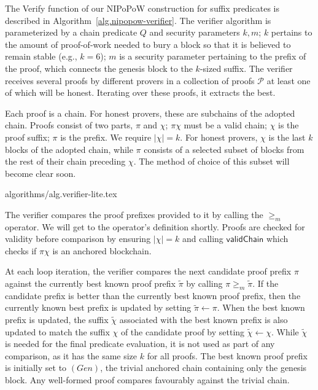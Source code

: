 The \textsf{Verify} function of our NIPoPoW construction  for suffix predicates
is described in Algorithm~\ref{alg.nipopow-verifier}. The verifier algorithm is
parameterized by a chain predicate $Q$ and security parameters $k, m$; $k$
pertains to the amount of proof-of-work needed to bury a block so that it is
believed to remain stable (e.g., $k = 6$); $m$ is a security parameter
pertaining to the prefix of the proof, which connects the genesis block to the
$k$-sized suffix. The verifier receives several proofs by different provers in a
collection of proofs $\mathcal{P}$ at least one of which will be honest.
Iterating over these proofs, it extracts the best.

Each proof is a chain. For honest provers, these are subchains of the  adopted
chain. Proofs consist of two parts, $\pi$ and $\chi$; $\pi \chi$ must be a valid
chain; $\chi$ is the proof suffix; $\pi$ is the prefix. We require $|\chi| = k$.
For honest provers, $\chi$ is the last $k$ blocks of the adopted chain, while
$\pi$ consists of a selected subset of blocks from the rest of their chain
preceding $\chi$. The method of choice of this subset will become clear soon.

{algorithms/alg.verifier-lite.tex}

The verifier compares the proof prefixes provided to it by calling the $\geq_m$
operator. We will get to the operator's definition shortly. Proofs are checked
for validity before comparison by ensuring $|\chi| = k$ and calling
$\mathsf{validChain}$ which checks if $\pi\chi$ is an anchored blockchain.

At each loop iteration, the verifier compares the next candidate proof prefix
$\pi$ against the currently best known proof prefix $\tilde\pi$ by calling $\pi
\geq_m \tilde\pi$. If the candidate prefix is better than the currently best
known proof prefix, then the currently known best prefix is updated by setting
$\tilde\pi \leftarrow \pi$. When the best known prefix is updated, the suffix
$\tilde\chi$ associated with the best known prefix is also updated to match the
suffix $\chi$ of the candidate proof by setting $\tilde\chi \leftarrow \chi$.
While $\tilde\chi$ is needed for the final predicate evaluation, it is not used
as part of any comparison, as it has the same size $k$ for all proofs. The best
known proof prefix is initially set to $(Gen)$, the trivial anchored chain
containing only the genesis block. Any well-formed proof compares favourably
against the trivial chain.

